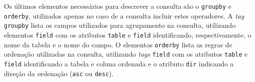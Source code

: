 Os últimos elementos necessários para descrever a consulta são o \texttt{groupby} e \texttt{orderby}, utilizados apenas no caso de a consulta incluir estes operadores. A \textit{tag} \texttt{groupby} lista os campos utilizados para agrupamento na consulta, utilizando elementos \texttt{field} com os atributos \texttt{table} e \texttt{field} identificando, respectivamente, o nome da tabela e o nome do campo. O elementos \texttt{orderby} lista as regras de ordenação utilizadas na consulta, utilizando \textit{tags} \texttt{field} com os atributos \texttt{table} e \texttt{field} identificando a tabela e coluna ordenada e o atributo \texttt{dir} indicando a direção da ordenação (\texttt{asc} ou \texttt{desc}).
